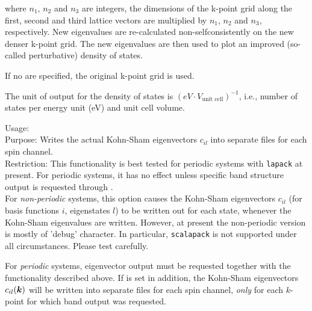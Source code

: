 where $n_1$, $n_2$ and $n_3$ are integers, the dimensions of the k-point grid along 
the first, second and third lattice vectors are multiplied by $n_1$, $n_2$ and $n_3$,
 respectively. New eigenvalues are re-calculated 
non-selfconsistently on the new denser k-point grid. The new eigenvalues are 
then used to plot an improved (so-called perturbative) density of states.

If no  are specified, the original k-point grid is used.

The unit of output for the density of states is $(eV \cdot
V_\text{unit cell})^{-1}$, i.e., number of states per energy unit (eV)
and unit cell volume.

{
  \noindent
  Usage:   \\[1.0ex]
  Purpose: Writes the actual Kohn-Sham eigenvectors $c_{il}$ into
    separate files for each spin channel. \\[1.0ex]
  Restriction: This functionality is best tested for periodic systems 
  with  \texttt{lapack} at present. For periodic systems,
  it has no effect unless specific band structure output is requested through
   . \\[1.0ex]
}
For \emph{non-periodic} systems, this option causes the Kohn-Sham eigenvectors
$c_{il}$ (for basis functions $i$, eigenstates $l$) to be written out for each
  state, whenever the Kohn-Sham eigenvalues 
are written. However, at present the non-periodic version is mostly of 'debug'
character. In particular,  \texttt{scalapack} is not
supported under all circumstances. Please test carefully.

For \emph{periodic} systems, eigenvector output must be requested together
with the   functionality described
above. If   is set in
addition, the Kohn-Sham eigenvectors $c_{il}(\mbox{\boldmath$k$})$ will be
written into separate files for each spin channel, \emph{only} for each
$k$-point for which band output was requested.

